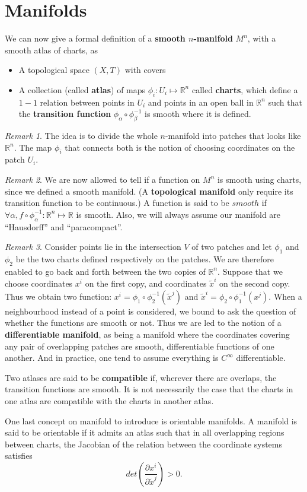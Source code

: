 \documentclass[a4paper,11pt]{article}
\theoremstyle{remark}
\newtheorem{remark}{Remark}[section]
\begin{document}
\section{Manifolds}
\label{s:mani}
We can now give a formal definition of a \textbf{smooth $n$-manifold}
$M^n$, with a smooth atlas of charts, as
\begin{itemize}
\item A topological space $(X, T)$ with covers
\item A collection (called \textbf{atlas}) of maps $\phi_i: U_i
  \mapsto \mathbb{R}^n$ called \textbf{charts}, which define a $1-1$
  relation between points in $U_i$ and points in an open ball in
  $\mathbb{R}^n$ such that the \textbf{transition function}
  $\phi_{\alpha}\circ \phi^{-1}_{\beta}$ is smooth where it is
  defined.
\end{itemize}
\begin{remark}The idea is to divide the whole $n$-manifold into
  patches that looks like $\mathbb{R}^n$. The map $\phi_i$ that
  connects both is the notion of choosing coordinates on the patch
  $U_i$.
\end{remark}
\begin{remark}
  We are now allowed to tell if a function on $M^n$ is smooth using
  charts, since we defined a smooth manifold. (A \textbf{topological
    manifold} only require its transition function to be continuous.)
  A function is said to be $smooth$ if $\forall \alpha,
  f\circ\phi_{\alpha}^{-1}: \mathbb{R}^n\mapsto\mathbb{R}$ is
  smooth. Also, we will always assume our manifold are ``Hausdorff''
  and ``paracompact''.%
\end{remark}
\begin{remark}
  Consider points lie in the intersection $V$ of two patches and let
  $\phi_1$ and $\phi_2$ be the two charts defined respectively on the
  patches. We are therefore enabled to go back and forth between the
  two copies of $\mathbb{R}^n$. Suppose that we choose coordinates
  $x^i$ on the first copy, and coordinates $\tilde{x}^i$ on the second
  copy. Thus we obtain two function: $x^i =
  \phi_1\circ\phi_2^{-1}(\tilde{x}^j)$ and $\tilde{x}^i =
  \phi_2\circ\phi_1^{-1}(x^j)$. When a neighbourhood instead of a
  point is considered, we bound to ask the question of whether the
  functions are smooth or not. Thus we are led to the notion of a
  \textbf{differentiable manifold}, as being a manifold where the
  coordinates covering any pair of overlapping patches are smooth,
  differentiable functions of one another. And in practice, one tend
  to assume everything is $C^{\infty}$ differentiable.
\end{remark}\par
Two atlases are said to be \textbf{compatible} if, wherever there are
overlaps, the transition functions are smooth. It is not necessarily
the case that the charts in one atlas are compatible with the charts
in another atlas.\par
One last concept on manifold to introduce is orientable manifolds. A
manifold is said to be orientable if it admits an atlas such that in
all overlapping regions between charts, the Jacobian of the relation
between the coordinate systems satisfies$$det\left( \frac{\partial
    x^i}{\partial\tilde{x}^j} \right)>0.$$
\end{document}
